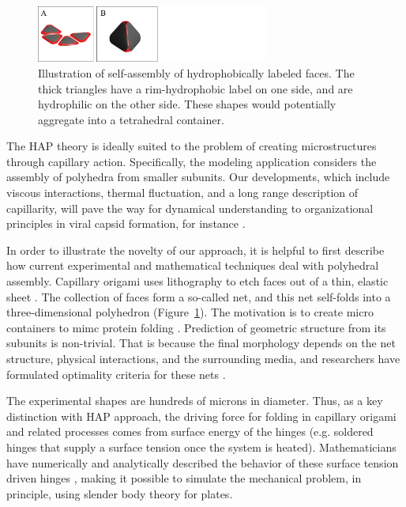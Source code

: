 \begin{figure}
\vspace*{+15pt}
\centerline{\includegraphics[width=3.0in]{figures/SA3_fig2.pdf}}
\vspace*{5pt}
\caption{{\footnotesize Illustration of self-assembly of hydrophobically labeled faces.
The thick triangles have a rim-hydrophobic label on one side, and are hydrophilic on the other side.
These shapes would potentially aggregate into a tetrahedral container. }}
\label{fig:illustration}
\end{figure}
The HAP theory is ideally suited to the problem of creating microstructures through capillary action. Specifically, the modeling application considers the assembly of polyhedra from smaller subunits. Our developments, which include viscous interactions, thermal fluctuation, and a long range description of capillarity, will pave the way for dynamical understanding to organizational principles in viral capsid formation, for instance \cite{CASPAR1962,Prasad2012}. 

In order to illustrate the novelty of our approach, it is helpful to first describe how current experimental and mathematical techniques deal with polyhedral assembly. Capillary origami uses lithography to etch faces out of a thin, elastic sheet \cite{Pandey2011,Reynolds2019}. The collection of faces form a so-called net, and this net self-folds into a three-dimensional polyhedron (Figure~\ref{fig:illustration}). The motivation is to create micro containers to mimc protein folding \cite{Reynolds2019}. Prediction of geometric structure from its subunits is non-trivial. That is because the final morphology depends on the net structure, physical interactions, and the surrounding media, and researchers have formulated optimality criteria for these nets \cite{Araujo2018,Pandey2011}. 

The experimental shapes are hundreds of microns in diameter. Thus, as a key distinction with HAP approach, the driving force for folding in capillary origami and related processes comes from surface energy of the hinges (e.g. soldered hinges that supply a surface tension once the system is heated). Mathematicians have numerically and analytically described the behavior of these surface tension driven hinges \cite{Bico2018,Peraud2014,Brubaker2016}, making it possible to simulate the mechanical problem, in principle, using slender body theory for plates. 

